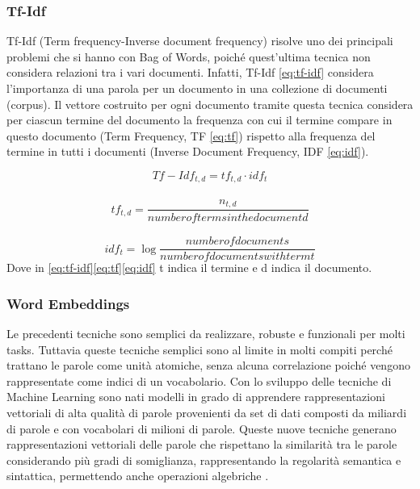 \subsubsection{Tf-Idf}\label{section-tfidf}
Tf-Idf (Term frequency-Inverse document frequency) \cite{manning_raghavan_schutze_2008} risolve uno dei principali problemi che si hanno con Bag of Words, poiché quest'ultima tecnica non considera relazioni tra i vari documenti. Infatti, Tf-Idf \eqref{eq:tf-idf} considera l'importanza di una parola per un documento in una collezione di documenti (corpus).
Il vettore costruito per ogni documento tramite questa tecnica considera per ciascun termine del documento la frequenza con cui il termine compare in questo documento (Term Frequency, TF \eqref{eq:tf}) rispetto alla frequenza del termine in tutti i documenti (Inverse Document Frequency, IDF \eqref{eq:idf}).

\begin{equation}
\label{eq:tf-idf}
   Tf-Idf_{t,d} = tf_{t,d} \cdot idf_t
\end{equation}\\
\begin{equation}
\label{eq:tf}
   tf_{t,d} = \frac{n_{t,d}}{number of terms in the document d} 
\end{equation}\\
\begin{equation}
\label{eq:idf}
   idf_{t} = \log \frac{number of documents}{number of documents with term t} 
\end{equation}
Dove in \eqref{eq:tf-idf}\eqref{eq:tf}\eqref{eq:idf} t indica il termine e d indica il documento.
\\
\subsubsection{Word Embeddings}
Le precedenti tecniche sono semplici da realizzare, robuste e funzionali per molti tasks. Tuttavia queste tecniche semplici sono al limite in molti compiti perché trattano le parole come unità atomiche, senza alcuna correlazione poiché vengono rappresentate come indici di un vocabolario. 
Con lo sviluppo delle tecniche di Machine Learning sono nati modelli in grado di apprendere rappresentazioni vettoriali di alta qualità di parole provenienti da set di dati composti da miliardi di parole e con vocabolari di milioni di parole. Queste nuove tecniche generano rappresentazioni vettoriali delle parole che rispettano la similarità tra le parole considerando più gradi di somiglianza, rappresentando la regolarità semantica e sintattica, permettendo anche operazioni algebriche \cite{mikolov2013efficient}.
